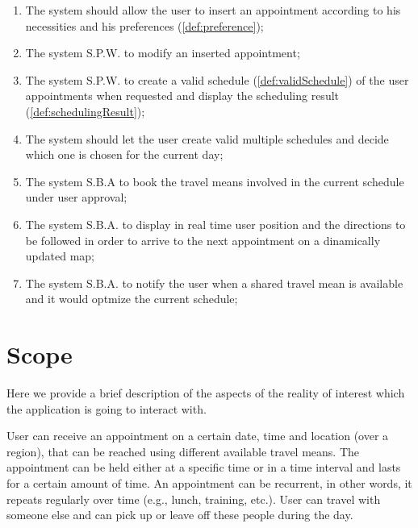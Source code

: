 \begin{enumerate}
\item The system should allow the user to insert an appointment according to his necessities and his preferences (\ref{def:preference});
\label{goal:G4}

\item The system S.P.W. to modify an inserted appointment;
\label{goal:G5} 

\item The system S.P.W. to create a valid schedule (\ref{def:validSchedule}) of the user appointments when requested and display the scheduling result (\ref{def:schedulingResult});
\label{goal:G6}

\item The system should let the user create valid multiple schedules and decide which one is chosen for the current day;
\label{goal:G7}

\item The system S.B.A to book the travel means involved in the current schedule under user approval;
\label{goal:G8} 

\item The system S.B.A. to display in real time user position and the directions to be followed in order to arrive to the next appointment on a dinamically updated map; \label{goal:G9}

\item The system S.B.A. to notify the user when a shared travel mean is available and it would optmize the current schedule; \label{goal:G10}

\end{enumerate}


\section{Scope}

Here we provide a brief description of the aspects of the reality of interest which the application is going to interact with.

User can receive an appointment on a certain date, time and location (over a region), that can be reached using different available travel means. The appointment can be held either at a specific time or in a time interval and lasts for a certain amount of time. An appointment can be recurrent, in other words, it repeats regularly over time (e.g., lunch, training, etc.). User can travel with someone else and can pick up or leave off these people during the day.

